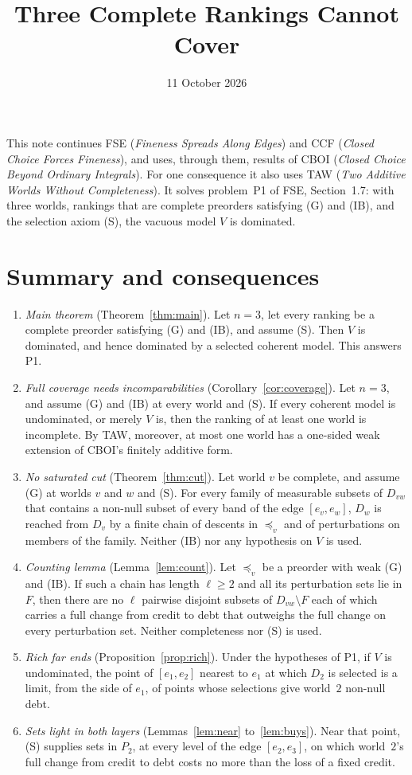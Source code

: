 \documentclass[11pt]{article}
\title{Three Complete Rankings Cannot Cover}
\author{}\date{11 October 2026}
\theoremstyle{definition}\newtheorem{definition}[theorem]{Definition}
\theoremstyle{remark}\newtheorem{remark}[theorem]{Remark}
\begin{document}
\maketitle

\noindent
This note continues FSE (\emph{Fineness Spreads Along Edges}) and CCF
(\emph{Closed Choice Forces Fineness}), and uses, through them, results of
CBOI (\emph{Closed Choice Beyond Ordinary Integrals}). For one consequence it
also uses TAW (\emph{Two Additive Worlds Without Completeness}). It solves
problem~P1 of FSE, Section~1.7: with three worlds, rankings that are
complete preorders satisfying (G) and (IB), and the selection axiom (S),
the vacuous model $V$ is dominated.

\section{Summary and consequences}\label{sec:summary}

\begin{enumerate}[leftmargin=*,itemsep=3pt]
\item \emph{Main theorem} (Theorem~\ref{thm:main}). Let $n=3$, let every
ranking be a complete preorder satisfying (G) and (IB), and assume (S). Then
$V$ is dominated, and hence dominated by a selected coherent model. This
answers P1.
\item \emph{Full coverage needs incomparabilities}
(Corollary~\ref{cor:coverage}). Let $n=3$, and assume (G) and (IB) at every
world and (S). If every coherent model is undominated, or merely $V$ is,
then the ranking of at least one world is incomplete. By TAW, moreover, at
most one world has a one-sided weak extension of CBOI's finitely additive
form.
\item \emph{No saturated cut} (Theorem~\ref{thm:cut}). Let world $v$ be
complete, and assume (G) at worlds $v$ and $w$ and (S). For every family of
measurable subsets of $D_{vw}$ that contains a non-null subset of every band
of the edge $[e_v,e_w]$, $D_w$ is reached from $D_v$ by a finite chain of descents in
$\preceq_v$ and of perturbations on members of the family. Neither (IB) nor
any hypothesis on $V$ is used.
\item \emph{Counting lemma} (Lemma~\ref{lem:count}). Let $\preceq_v$ be a
preorder with weak (G) and (IB). If such a chain has length $\ell\ge2$ and
all its perturbation sets lie in $F$, then there are no $\ell$ pairwise disjoint
subsets of $D_{vw}\setminus F$ each of which carries a full change from
credit to debt that outweighs the full change on every perturbation set.
Neither completeness nor (S) is used.
\item \emph{Rich far ends} (Proposition~\ref{prop:rich}). Under the
hypotheses of P1, if $V$ is undominated, the point of $[e_1,e_2]$ nearest to
$e_1$ at which $D_2$ is selected is a limit, from the side of $e_1$, of
points whose selections give world~$2$ non-null debt.
\item \emph{Sets light in both layers} (Lemmas~\ref{lem:near}
to~\ref{lem:buys}). Near that point, (S) supplies sets in $P_2$, at
every level of the edge $[e_2,e_3]$, on which world~$2$'s full change from
credit to debt costs no more than the loss of a fixed credit.
\end{enumerate}
\end{document}
